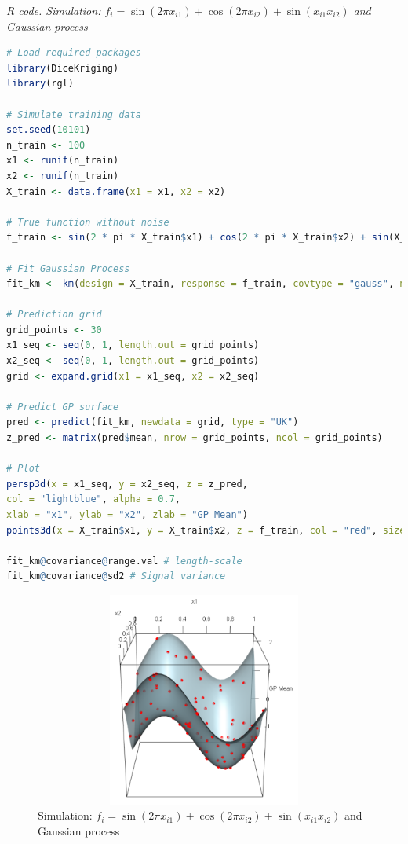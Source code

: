 \begin{tcolorbox}[enhanced,width=4.67in,center upper,
	fontupper=\large\bfseries,drop shadow southwest,sharp corners]
	\textit{R code. Simulation: $f_i=\sin(2\pi x_{i1}) + \cos(2\pi x_{i2}) + \sin(x_{i1} x_{i2})$ and Gaussian process}
	\begin{VF}
		\begin{lstlisting}[language=R]
# Load required packages
library(DiceKriging)
library(rgl)

# Simulate training data
set.seed(10101)
n_train <- 100
x1 <- runif(n_train)
x2 <- runif(n_train)
X_train <- data.frame(x1 = x1, x2 = x2)

# True function without noise
f_train <- sin(2 * pi * X_train$x1) + cos(2 * pi * X_train$x2) + sin(X_train$x1 * X_train$x2)

# Fit Gaussian Process
fit_km <- km(design = X_train, response = f_train, covtype = "gauss", nugget = 1e-10)

# Prediction grid
grid_points <- 30
x1_seq <- seq(0, 1, length.out = grid_points)
x2_seq <- seq(0, 1, length.out = grid_points)
grid <- expand.grid(x1 = x1_seq, x2 = x2_seq)

# Predict GP surface
pred <- predict(fit_km, newdata = grid, type = "UK")
z_pred <- matrix(pred$mean, nrow = grid_points, ncol = grid_points)

# Plot
persp3d(x = x1_seq, y = x2_seq, z = z_pred,
col = "lightblue", alpha = 0.7,
xlab = "x1", ylab = "x2", zlab = "GP Mean")
points3d(x = X_train$x1, y = X_train$x2, z = f_train, col = "red", size = 8)

fit_km@covariance@range.val # length-scale
fit_km@covariance@sd2 # Signal variance
\end{lstlisting}
	\end{VF}
\end{tcolorbox}

\begin{figure}[!h]
	\centering
	\includegraphics[width=340pt, height=200pt]{Chapters/chapter13/figures/GPsim3D.png}
	\caption{Simulation: $f_i=\sin(2\pi x_{i1}) + \cos(2\pi x_{i2}) + \sin(x_{i1} x_{i2})$ and Gaussian process}
	\label{GPsim3D}
\end{figure} 

